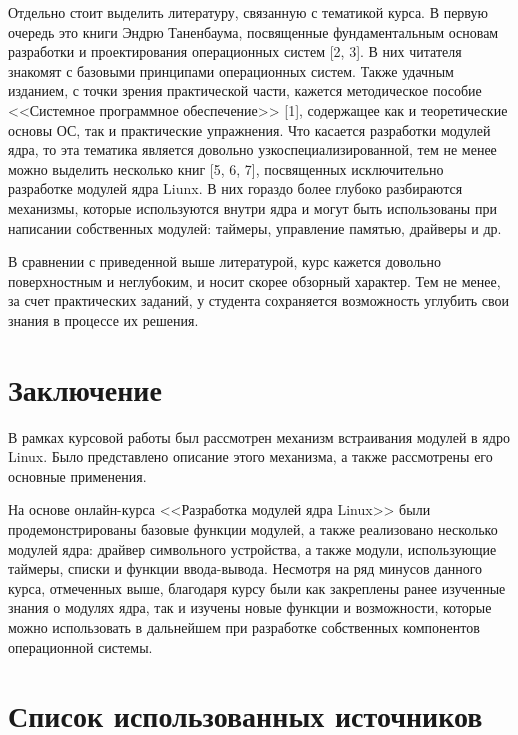 Отдельно стоит выделить литературу, связанную с тематикой курса. В первую очередь это книги Эндрю Таненбаума, посвященные фундаментальным основам разработки и проектирования операционных систем [2, 3]. В них читателя знакомят с базовыми принципами операционных систем. Также удачным изданием, с точки зрения практической части, кажется методическое пособие <<Системное программное обеспечение>> [1], содержащее как и теоретические основы ОС, так и практические упражнения. Что касается разработки модулей ядра, то эта тематика является довольно узкоспециализированной, тем не менее можно выделить несколько книг [5, 6, 7], посвященных исключительно разработке модулей ядра Liunx. В них гораздо более глубоко разбираются механизмы, которые используются внутри ядра и могут быть использованы при написании собственных модулей: таймеры, управление памятью, драйверы и др.

В сравнении с приведенной выше литературой, курс кажется довольно поверхностным и неглубоким, и носит скорее обзорный характер. Тем не менее, за счет практических заданий, у студента сохраняется возможность углубить свои знания в процессе их решения.

\newpage

\section{Заключение}

В рамках курсовой работы был рассмотрен механизм встраивания модулей в ядро Linux. Было представлено описание этого механизма, а также рассмотрены его основные применения.

На основе онлайн-курса <<Разработка модулей ядра Linux>> были продемонстрированы базовые функции модулей, а также реализовано несколько модулей ядра: драйвер символьного устройства, а также модули, использующие таймеры, списки и функции ввода-вывода. Несмотря на ряд минусов данного курса, отмеченных выше, благодаря курсу были как закреплены ранее изученные знания о модулях ядра, так и изучены новые функции и возможности, которые можно использовать в дальнейшем при разработке собственных компонентов операционной системы.

\newpage

\section*{Список использованных источников}

